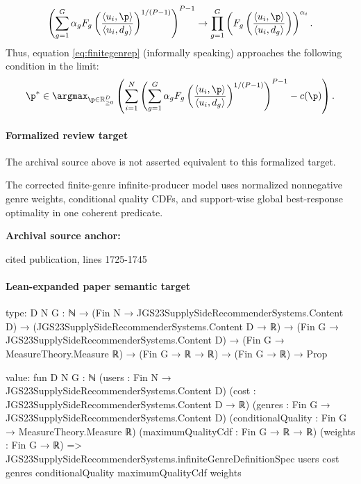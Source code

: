 \documentclass[10pt]{article}
\begin{document}
\begin{ReviewVerbatim}
\[\left(\sum_{g=1}^G \alpha_g F_g\left(\frac{\langle u_i, \p \rangle}{\langle u_i, d_g \rangle} \right)^{1/(P-1)}\right)^{P-1} \rightarrow \prod_{g=1}^G \left(F_g\left(\frac{\langle u_i, \p \rangle}{\langle u_i, d_g \rangle} \right)\right)^{\alpha_i}.\]
Thus, equation \ref{eq:finitegenrep} (informally speaking) approaches the following condition in the limit:
\begin{equation}
\label{eq:infinitegenrecondition}
   \p^* \in \argmax_{\p \in \mathbb{R}_{\ge 0}^D} \left(\sum_{i=1}^N \left(\sum_{g=1}^G \alpha_g F_g\left(\frac{\langle u_i, \p \rangle}{\langle u_i, d_g \rangle} \right)^{1/(P-1)} \right)^{P-1} - c(\p) \right).
\end{equation}
\end{ReviewVerbatim}


\paragraph{Formalized review target}
The archival source above is not asserted equivalent to this formalized target.
\begin{ReviewVerbatim}
The corrected finite-genre infinite-producer model uses normalized nonnegative genre weights, conditional quality CDFs, and support-wise global best-response optimality in one coherent predicate.
\end{ReviewVerbatim}

\textbf{Archival source anchor:} {\footnotesize\raggedright cited publication, lines 1725-\allowbreak{}1745\par}
\paragraph{Lean-expanded paper semantic target}
\begin{ReviewVerbatim}
type:
{D N G : ℕ} →
  (Fin N → JGS23SupplySideRecommenderSystems.Content D) →
    (JGS23SupplySideRecommenderSystems.Content D → ℝ) →
      (Fin G → JGS23SupplySideRecommenderSystems.Content D) →
        (Fin G → MeasureTheory.Measure ℝ) → (Fin G → ℝ → ℝ) → (Fin G → ℝ) → Prop

value:
fun {D N G : ℕ} (users : Fin N → JGS23SupplySideRecommenderSystems.Content D)
    (cost : JGS23SupplySideRecommenderSystems.Content D → ℝ)
    (genres : Fin G → JGS23SupplySideRecommenderSystems.Content D)
    (conditionalQuality : Fin G → MeasureTheory.Measure ℝ) (maximumQualityCdf : Fin G → ℝ → ℝ) (weights : Fin G → ℝ) =>
  JGS23SupplySideRecommenderSystems.infiniteGenreDefinitionSpec users cost genres conditionalQuality maximumQualityCdf
    weights
\end{ReviewVerbatim}
\end{document}
